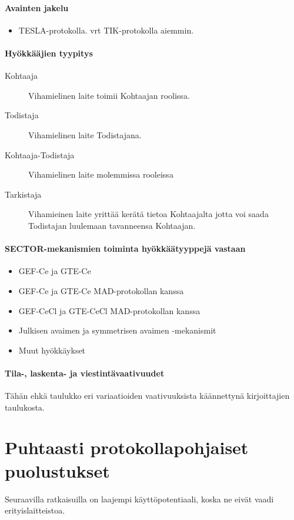 \documentclass[finnish]{tktltiki2}
\theoremstyle{definition}
\theoremstyle{remark}
\begin{document}
\paragraph{Avainten jakelu}

\begin{itemize}
\item TESLA-protokolla. vrt TIK-protokolla aiemmin.
\end{itemize}

\paragraph{Hyökkääjien tyypitys}

\begin{description}
\item[Kohtaaja] Vihamielinen laite toimii Kohtaajan roolissa.
\item[Todistaja] Vihamielinen laite Todistajana.
\item[Kohtaaja-Todistaja] Vihamielinen laite molemmissa rooleissa
\item[Tarkistaja] Vihamieinen laite yrittää kerätä tietoa Kohtaajalta jotta voi saada Todistajan luulemaan tavanneensa Kohtaajan.
\end{description}

\paragraph{SECTOR-mekanismien toiminta hyökkäätyyppejä vastaan}

\begin{itemize}
\item GEF-Ce ja GTE-Ce
\item GEF-Ce ja GTE-Ce MAD-protokollan kanssa
\item GEF-CeCl ja GTE-CeCl MAD-protokollan kanssa
\item Julkisen avaimen ja symmetrisen avaimen -mekanismit
\item Muut hyökkäykset
\end{itemize}

\paragraph{Tila-, laskenta- ja viestintävaativuudet}

Tähän ehkä taulukko eri variaatioiden vaativuuksista käännettynä kirjoittajien taulukosta.

\section{Puhtaasti protokollapohjaiset puolustukset}
Seuraavilla ratkaisuilla on laajempi käyttöpotentiaali, koska ne eivät vaadi erityislaitteistoa.
\end{document}
